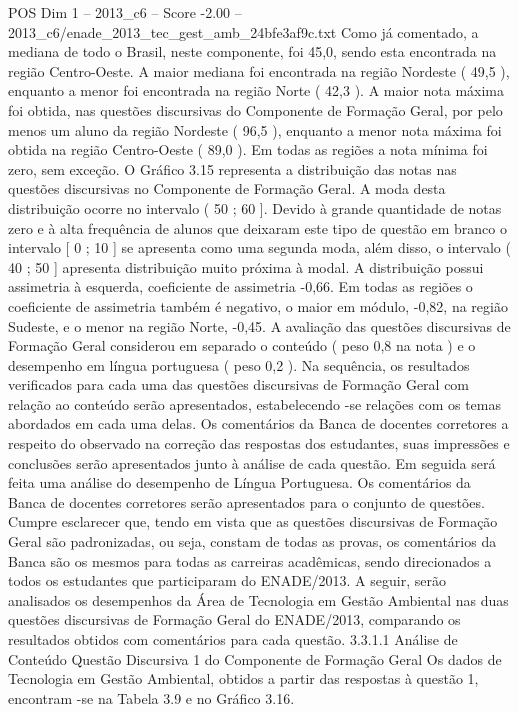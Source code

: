 \begin{textsample}{POS Dim 1 – 2013\_c6 – Score -2.00 – 2013\_c6/enade\_2013\_tec\_gest\_amb\_24bfe3af9c.txt}
Como já comentado, a mediana de todo o Brasil, neste componente, foi 45,0, sendo esta encontrada na região Centro-Oeste.
A maior mediana foi encontrada na região Nordeste ( 49,5 ), enquanto a menor foi encontrada na região Norte ( 42,3 ).
A maior nota máxima foi obtida, nas questões discursivas do Componente de Formação Geral, por pelo menos um aluno da região Nordeste ( 96,5 ), enquanto a menor nota máxima foi obtida na região Centro-Oeste ( 89,0 ).
Em todas as regiões a nota mínima foi zero, sem exceção.
O Gráfico 3.15 representa a distribuição das notas nas questões discursivas no Componente de Formação Geral.
A moda desta distribuição ocorre no intervalo ( 50 ; 60 ].
Devido à grande quantidade de notas zero e à alta frequência de alunos que deixaram este tipo de questão em branco o intervalo [ 0 ; 10 ] se apresenta como uma segunda moda, além disso, o intervalo ( 40 ; 50 ] apresenta distribuição muito próxima à modal.
A distribuição possui assimetria à esquerda, coeficiente de assimetria -0,66.
Em todas as regiões o coeficiente de assimetria também é negativo, o maior em módulo, -0,82, na região Sudeste, e o menor na região Norte, -0,45.
A avaliação das questões discursivas de Formação Geral considerou em separado o conteúdo ( peso 0,8 na nota ) e o desempenho em língua portuguesa ( peso 0,2 ).
Na sequência, os resultados verificados para cada uma das questões discursivas de Formação Geral com relação ao conteúdo serão apresentados, estabelecendo -se relações com os temas abordados em cada uma delas.
Os comentários da Banca de docentes corretores a respeito do observado na correção das respostas dos estudantes, suas impressões e conclusões serão apresentados junto à análise de cada questão.
Em seguida será feita uma análise do desempenho de Língua Portuguesa.
Os comentários da Banca de docentes corretores serão apresentados para o conjunto de questões.
Cumpre esclarecer que, tendo em vista que as questões discursivas de Formação Geral são padronizadas, ou seja, constam de todas as provas, os comentários da Banca são os mesmos para todas as carreiras acadêmicas, sendo direcionados a todos os estudantes que participaram do ENADE/2013.
A seguir, serão analisados os desempenhos da Área de Tecnologia em Gestão Ambiental nas duas questões discursivas de Formação Geral do ENADE/2013, comparando os resultados obtidos com comentários para cada questão. 3.3.1.1 Análise de Conteúdo Questão Discursiva 1 do Componente de Formação Geral Os dados de Tecnologia em Gestão Ambiental, obtidos a partir das respostas à questão 1, encontram -se na Tabela 3.9 e no Gráfico 3.16.

\end{textsample}
